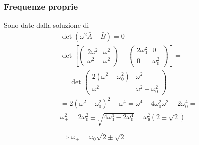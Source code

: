 \documentclass[Main.tex]{subfiles}
\begin{document}
\begin{tema}
\subsubsection*{Frequenze proprie}
Sono date dalla soluzione di 
\begin{gather}
	\det (\omega^2 \bar A - \bar B )=0\\
	\det \left[\left( \begin{matrix}
		2 \omega^2 & \omega^2 \\ \omega^2 & \omega^2
	\end{matrix} \right) - \left( \begin{matrix}
		2 \omega_0^2 & 0 \\ 0 & \omega_0^2
	\end{matrix} \right)\right] =\\
	= \det \left( \begin{matrix}
 	2(\omega^2- \omega_0^2) & \omega^2 \\ \omega^2 & \omega^2 - \omega_0^2
 \end{matrix} \right)=\\
 = 2 (\omega^2 - \omega_0^2)^2 - \omega^4 = \omega^4 - 4 \omega_0 ^2 \omega^2 + 2 \omega_0^4=\\
 \omega_\pm^2 = 2 \omega_0 ^2 \pm \sqrt{4 \omega_0 ^4 - 2 \omega_0 ^4}= \omega_0^2 \left( 2 \pm \sqrt{2}\right)\\
 \ \\
 \Rightarrow \boxed{\omega_\pm = \omega_0 \sqrt{2 \pm \sqrt{2}}}
\end{gather}

\end{tema}
\end{document}
